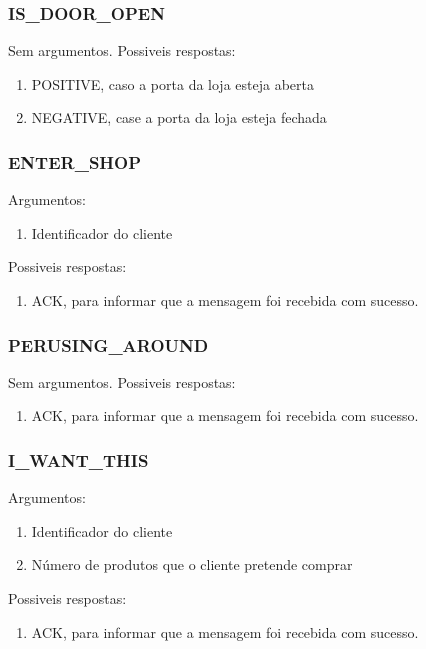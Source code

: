\documentclass[11pt,a4paper]{report}
\begin{document}
\subsubsection{IS\_DOOR\_OPEN}
Sem argumentos.
Possiveis respostas:
\begin{enumerate}
    \itemsep-0.4em
    \item POSITIVE, caso a porta da loja esteja aberta
    \item NEGATIVE, case a porta da loja esteja fechada
\end{enumerate}

\subsubsection{ENTER\_SHOP}
Argumentos:
\begin{enumerate}
    \itemsep-0.4em
    \item Identificador do cliente
\end{enumerate}
Possiveis respostas:
\begin{enumerate}
    \itemsep-0.4em
    \item ACK, para informar que a mensagem foi recebida com sucesso.
\end{enumerate}

\subsubsection{PERUSING\_AROUND}
Sem argumentos.
Possiveis respostas:
\begin{enumerate}
    \itemsep-0.4em
    \item ACK, para informar que a mensagem foi recebida com sucesso.
\end{enumerate}

\subsubsection{I\_WANT\_THIS}
Argumentos:
\begin{enumerate}
    \itemsep-0.4em
    \item Identificador do cliente
    \item Número de produtos que o cliente pretende comprar
\end{enumerate}
Possiveis respostas:
\begin{enumerate}
    \itemsep-0.4em
    \item ACK, para informar que a mensagem foi recebida com sucesso.
\end{enumerate}
\end{document}
